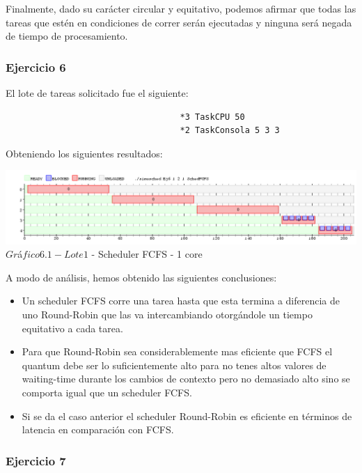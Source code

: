 \indent Finalmente, dado su carácter circular y equitativo, podemos afirmar que todas las tareas que 
estén en condiciones de correr serán ejecutadas y ninguna será negada de tiempo de procesamiento.\\


\subsubsection[Resolución Ejercicio 6]{Ejercicio 6}

El lote de tareas solicitado fue el siguiente:
\begin{verbatim}
                                   *3 TaskCPU 50
                                   *2 TaskConsola 5 3 3
\end{verbatim}

Obteniendo los siguientes resultados:

\begin{center}
  	\includegraphics[width=450pt]{./Test/ej6.png}
	  {$Gr$\'a$fico 6.1 - Lote 1$ - Scheduler FCFS - 1 core}	
\end{center}

\indent A modo de an\'alisis, hemos obtenido las siguientes conclusiones:\\


\begin{itemize}
 \item Un scheduler FCFS corre una tarea hasta que esta termina a diferencia de uno Round-Robin 
que las va intercambiando otorg\'{a}ndole un tiempo equitativo a cada tarea.
\item Para que Round-Robin sea considerablemente mas eficiente que FCFS el quantum debe ser 
lo suficientemente alto para no tenes altos valores de waiting-time durante los cambios de 
contexto pero no demasiado alto sino se comporta igual que un scheduler FCFS.
\item Si se da el caso anterior el scheduler Round-Robin es eficiente en t\'{e}rminos 
de latencia en comparaci\'{o}n con FCFS.
\end{itemize}


\subsubsection[Resolución Ejercicio 7]{Ejercicio 7}

